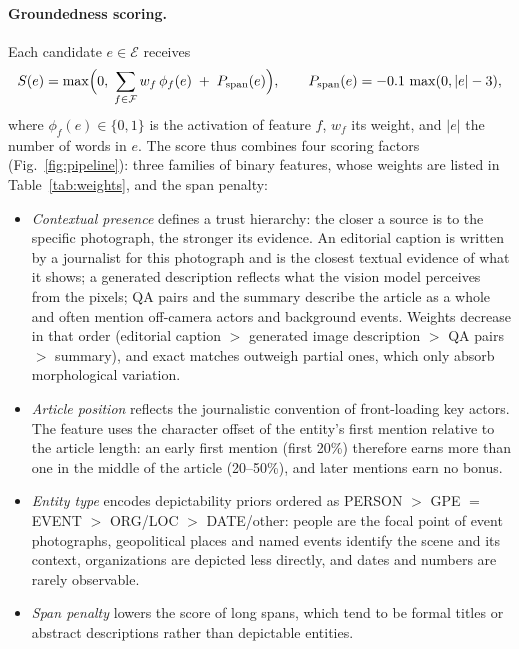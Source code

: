 \documentclass[runningheads]{llncs}
\DeclareRobustCommand{\aciids}[1]{{\color{olive}#1}}
\DeclareRobustCommand{\revise}[1]{{\color{blue}#1}}
\DeclareRobustCommand{\aciids}[1]{#1}
\DeclareRobustCommand{\revise}[1]{#1}
\begin{document}
\paragraph{Groundedness scoring.}
Each candidate $e\in\mathcal{E}$ receives
\begin{equation}
S(e)=\max\Bigl(0,\;\sum_{f\in\mathcal{F}} w_f\,\phi_f(e)\;+\;P_{\mathrm{span}}(e)\Bigr),
\qquad
P_{\mathrm{span}}(e)=-0.1\,\max(0,|e|-3),
\label{eq:entity_score}
\end{equation}
where $\phi_f(e)\in\{0,1\}$ is the activation of feature $f$, $w_f$ its weight, and $|e|$ the number of words in $e$. \aciids{The score thus combines four scoring factors (Fig.~\ref{fig:pipeline}): three families of binary features, whose weights are listed in Table~\ref{tab:weights}, and the span penalty:}
\begin{itemize}
  \item \textit{Contextual presence} defines a trust hierarchy: the closer a source is to the specific photograph, the stronger its evidence. \revise{An editorial caption is written by a journalist for this photograph and is the closest textual evidence of what it shows; a generated description reflects what the vision model perceives from the pixels; QA pairs and the summary describe the article as a whole and often mention off-camera actors and background events.} Weights decrease in that order \aciids{(editorial caption $>$ generated image description $>$ QA pairs $>$ summary)}, and exact matches outweigh partial ones, which only absorb morphological variation.
  \item \textit{Article position} reflects the journalistic convention of front-loading key actors. \revise{The feature uses the character offset of the entity's first mention relative to the article length:} \aciids{an early first mention \revise{(first 20\%)} therefore earns more than one in the middle of the article \revise{(20--50\%)}, and later mentions earn no bonus.}
  \item \textit{Entity type} encodes depictability priors \aciids{ordered as PERSON $>$ GPE \revise{$=$} EVENT $>$ ORG/LOC $>$ DATE/other}: people are the focal point of event photographs, \revise{geopolitical places and named events identify the scene and its context}, organizations are depicted less directly, and dates and numbers are rarely observable.
  \item \aciids{\textit{Span penalty} lowers the score of long spans, which tend to be formal titles or abstract descriptions rather than depictable entities.}
\end{itemize}
\end{document}
